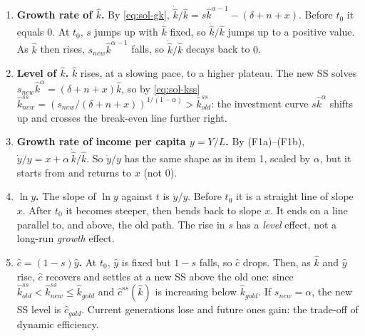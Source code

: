 \begin{enumerate}
  \item \textbf{Growth rate of $\hat k$.} By \eqref{eq:sol-gk}, $\dot{\hat k}/\hat k=s\hat k^{\alpha-1}-(\delta+n+x)$. Before $t_0$ it equals $0$. At $t_0$, $s$ jumps up with $\hat k$ fixed, so $\dot{\hat k}/\hat k$ jumps up to a positive value. As $\hat k$ then rises, $s_{new}\hat k^{\alpha-1}$ falls, so $\dot{\hat k}/\hat k$ decays back to $0$.
  \item \textbf{Level of $\hat k$.} $\hat k$ rises, at a slowing pace, to a higher plateau. The new SS solves $s_{new}\hat k^{\alpha}=(\delta+n+x)\hat k$, so by \eqref{eq:sol-kss} $\hat k^{ss}_{new}=(s_{new}/(\delta+n+x))^{1/(1-\alpha)}>\hat k^{ss}_{old}$: the investment curve $s\hat k^\alpha$ shifts up and crosses the break-even line further right.
  \item \textbf{Growth rate of income per capita $y=Y/L$.} By (F1a)--(F1b), $\dot y/y=x+\alpha\,\dot{\hat k}/\hat k$. So $\dot y/y$ has the same shape as in item 1, scaled by $\alpha$, but it starts from and returns to $x$ (not $0$).
  \item \textbf{$\ln y$.} The slope of $\ln y$ against $t$ is $\dot y/y$. Before $t_0$ it is a straight line of slope $x$. After $t_0$ it becomes steeper, then bends back to slope $x$. It ends on a line parallel to, and above, the old path. The rise in $s$ has a \emph{level} effect, not a long-run \emph{growth} effect.
  \item \textbf{$\hat c=(1-s)\hat y$.} At $t_0$, $\hat y$ is fixed but $1-s$ falls, so $\hat c$ drops. Then, as $\hat k$ and $\hat y$ rise, $\hat c$ recovers and settles at a new SS above the old one: since $\hat k^{ss}_{old}<\hat k^{ss}_{new}\le\hat k_{gold}$ and $\hat c^{ss}(\hat k)$ is increasing below $\hat k_{gold}$. If $s_{new}=\alpha$, the new SS level is $\hat c_{gold}$. Current generations lose and future ones gain: the trade-off of dynamic efficiency.
\end{enumerate}

